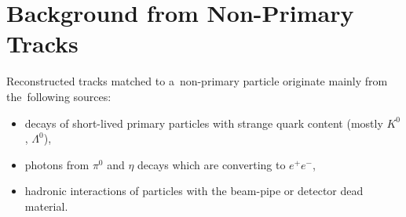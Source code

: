 \section{Background from Non-Primary Tracks}\label{section:star_background_primary}
Reconstructed tracks matched to a~non-primary particle  originate  mainly from the~following sources:
\begin{itemize}
	\item decays of short-lived primary particles with strange quark content (mostly $K^0$, $\Lambda^0$),
	\item photons from $\pi^0$ and $\eta$ decays which are converting to $e^+e^-$,
	\item hadronic interactions of particles with the beam-pipe or detector dead material.
\end{itemize} 

